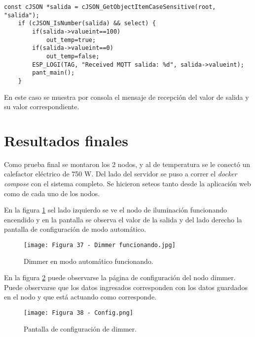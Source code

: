
\begin{lstlisting}[caption={Muestra por consola de la terminal ESP-IDF}, label={lst:dispositivo}]
const cJSON *salida = cJSON_GetObjectItemCaseSensitive(root, "salida");
    if (cJSON_IsNumber(salida) && select) {
        if(salida->valueint==100)
            out_temp=true;
        if(salida->valueint==0)
            out_temp=false;
        ESP_LOGI(TAG, "Received MQTT salida: %d", salida->valueint);
        pant_main();
    }
\end{lstlisting}

En este caso se muestra por consola el mensaje de recepción del valor de salida y su valor correspondiente.

\section{Resultados finales}

Como prueba final se montaron los 2 nodos, y al de temperatura se le conectó un calefactor eléctrico de 750 W. Del lado del servidor se puso a correr el \textit{docker compose} con el sistema completo. Se hicieron seteos tanto desde la aplicación web como de cada uno de los nodos.

En la figura \ref{fig:37} sel lado izquierdo se ve el nodo de iluminación funcionando encendido y en la pantalla se observa el valor de la salida y del lado derecho la pantalla de configuración de modo automático.

\begin{figure}[h]
\centering
\texttt{[image: Figura 37 - Dimmer funcionando.jpg]}
\caption[Dimmer funciona]{Dimmer en modo automático funcionando.}
\label{fig:37}
\end{figure}

En la figura \ref{fig:38} puede observarse la página de configuración del nodo dimmer. Puede observarse que los datos ingresados corresponden con los datos guardados en el nodo y que está actuando como corresponde.

\begin{figure}[h]
\centering
\texttt{[image: Figura 38 - Config.png]}
\caption[Config dimmer]{Pantalla de configuración de dimmer.}
\label{fig:38}
\end{figure}

